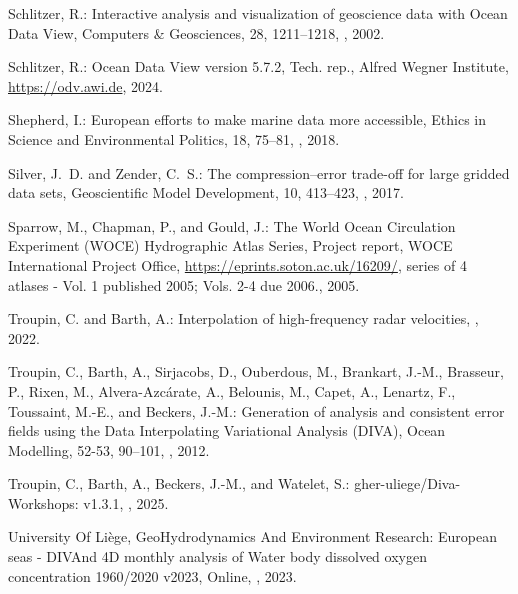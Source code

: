 \documentclass[essd,manuscript]{copernicus}
\begin{document}
\begin{thebibliography}{52}
Schlitzer, R.: Interactive analysis and visualization of geoscience data with
  Ocean Data View, Computers \& Geosciences, 28, 1211–1218,
  , 2002.

Schlitzer, R.: {Ocean Data View version 5.7.2}, Tech. rep., Alfred Wegner
  Institute, \urlprefix\url{https://odv.awi.de}, 2024.

Shepherd, I.: European efforts to make marine data more accessible, Ethics in
  Science and Environmental Politics, 18, 75–81, ,
  2018.

Silver, J.~D. and Zender, C.~S.: The compression–error trade-off for large
  gridded data sets, Geoscientific Model Development, 10, 413–423,
  , 2017.

Sparrow, M., Chapman, P., and Gould, J.: {The World Ocean Circulation
  Experiment (WOCE) Hydrographic Atlas Series}, Project report, {WOCE
  International Project Office},
  \urlprefix\url{https://eprints.soton.ac.uk/16209/}, series of 4 atlases -
  Vol. 1 published 2005; Vols. 2-4 due 2006., 2005.

Troupin, C. and Barth, A.: Interpolation of high-frequency radar velocities,
  , 2022.

Troupin, C., Barth, A., Sirjacobs, D., Ouberdous, M., Brankart, J.-M.,
  Brasseur, P., Rixen, M., Alvera-Azcárate, A., Belounis, M., Capet, A.,
  Lenartz, F., Toussaint, M.-E., and Beckers, J.-M.: Generation of analysis and
  consistent error fields using the Data Interpolating Variational Analysis
  (DIVA), Ocean Modelling, 52-53, 90--101, ,
  2012.

Troupin, C., Barth, A., Beckers, J.-M., and Watelet, S.:
  gher-uliege/Diva-Workshops: v1.3.1, , 2025.

{{University Of Liège, GeoHydrodynamics And Environment Research}}: European
  seas - DIVAnd 4D monthly analysis of Water body dissolved oxygen
  concentration 1960/2020 v2023, Online,
  , 2023.


\end{thebibliography}
\end{document}
